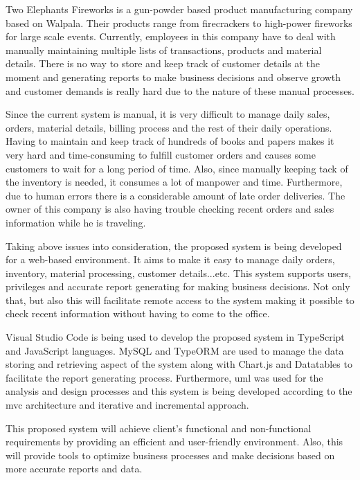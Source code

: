 \documentclass[12pt]{report}
\begin{document}
Two Elephants Fireworks is a gun-powder based product manufacturing company based on Walpala. Their products range from
firecrackers to high-power fireworks for large scale events. Currently, employees in this company have to deal with manually maintaining multiple lists of transactions, products and material details. There is no way to store and keep track of customer details at the moment and generating reports to make business decisions and observe growth and customer demands is really hard due to the nature of these manual processes.

Since the current system is manual, it is very difficult to manage daily sales, orders, material details, billing process and the rest of their daily operations. Having to maintain and keep track of hundreds of books and papers makes it very hard and time-consuming to fulfill customer orders and causes some customers to wait for a long period of time. Also, since manually keeping tack of the inventory is needed, it consumes a lot of manpower and time. Furthermore, due to human errors there is a considerable amount of late order  deliveries. The owner of this company is also having trouble checking recent orders and sales information while he is traveling.

Taking above issues into consideration, the proposed system  is being developed for a web-based environment. It aims to make it easy to manage daily orders, inventory, material processing, customer details...etc. This system supports users, privileges and accurate report generating for making business decisions. Not only that, but also this will facilitate remote access to the system making it possible to check recent information without having to come to the office.

Visual Studio Code is being used to develop the proposed system in TypeScript and JavaScript languages. MySQL and TypeORM are used to manage the data storing and retrieving aspect of the system along with Chart.js and Datatables to facilitate the report generating process. Furthermore, \acrlong{uml} was used for the analysis and design processes and this system is being developed according to the \acrshort{mvc} architecture and iterative and incremental approach.

This proposed system will achieve client's functional and non-functional requirements by providing an efficient and user-friendly environment. Also, this will provide tools to optimize business processes and make decisions based on more accurate reports and data.
\end{document}
